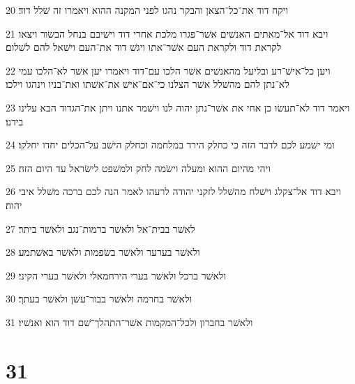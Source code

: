 \par 20 ויקח דוד את־כל־הצאן והבקר נהגו לפני המקנה ההוא ויאמרו זה שׁלל דוד׃
\par 21 ויבא דוד אל־מאתים האנשׁים אשׁר־פגרו מלכת אחרי דוד וישׁיבם בנחל הבשׂור ויצאו לקראת דוד ולקראת העם אשׁר־אתו ויגשׁ דוד את־העם וישׁאל להם לשׁלום׃
\par 22 ויען כל־אישׁ־רע ובליעל מהאנשׁים אשׁר הלכו עם־דוד ויאמרו יען אשׁר לא־הלכו עמי לא־נתן להם מהשׁלל אשׁר הצלנו כי־אם־אישׁ את־אשׁתו ואת־בניו וינהגו וילכו׃
\par 23 ויאמר דוד לא־תעשׂו כן אחי את אשׁר־נתן יהוה לנו וישׁמר אתנו ויתן את־הגדוד הבא עלינו בידנו׃
\par 24 ומי ישׁמע לכם לדבר הזה כי כחלק הירד במלחמה וכחלק הישׁב על־הכלים יחדו יחלקו׃
\par 25 ויהי מהיום ההוא ומעלה וישׂמה לחק ולמשׁפט לישׂראל עד היום הזה׃
\par 26 ויבא דוד אל־צקלג וישׁלח מהשׁלל לזקני יהודה לרעהו לאמר הנה לכם ברכה משׁלל איבי יהוה׃
\par 27 לאשׁר בבית־אל ולאשׁר ברמות־נגב ולאשׁר ביתר׃
\par 28 ולאשׁר בערער ולאשׁר בשׂפמות ולאשׁר באשׁתמע׃
\par 29 ולאשׁר ברכל ולאשׁר בערי הירחמאלי ולאשׁר בערי הקיני׃
\par 30 ולאשׁר בחרמה ולאשׁר בבור־עשׁן ולאשׁר בעתך׃
\par 31 ולאשׁר בחברון ולכל־המקמות אשׁר־התהלך־שׁם דוד הוא ואנשׁיו׃

\chapter{31}

